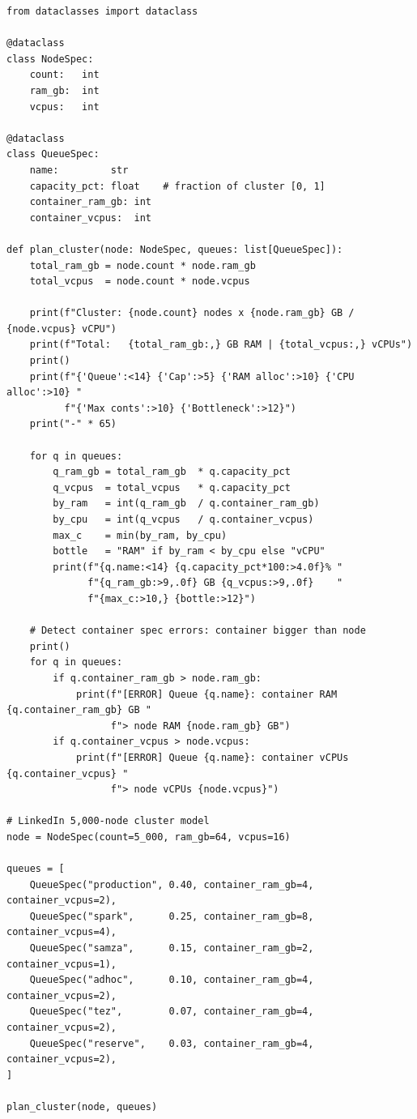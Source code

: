 \begin{lstlisting}[style=pyspark, caption={PE5.1: YARN capacity planning calculator}]
from dataclasses import dataclass

@dataclass
class NodeSpec:
    count:   int
    ram_gb:  int
    vcpus:   int

@dataclass
class QueueSpec:
    name:         str
    capacity_pct: float    # fraction of cluster [0, 1]
    container_ram_gb: int
    container_vcpus:  int

def plan_cluster(node: NodeSpec, queues: list[QueueSpec]):
    total_ram_gb = node.count * node.ram_gb
    total_vcpus  = node.count * node.vcpus

    print(f"Cluster: {node.count} nodes x {node.ram_gb} GB / {node.vcpus} vCPU")
    print(f"Total:   {total_ram_gb:,} GB RAM | {total_vcpus:,} vCPUs")
    print()
    print(f"{'Queue':<14} {'Cap':>5} {'RAM alloc':>10} {'CPU alloc':>10} "
          f"{'Max conts':>10} {'Bottleneck':>12}")
    print("-" * 65)

    for q in queues:
        q_ram_gb = total_ram_gb  * q.capacity_pct
        q_vcpus  = total_vcpus   * q.capacity_pct
        by_ram   = int(q_ram_gb  / q.container_ram_gb)
        by_cpu   = int(q_vcpus   / q.container_vcpus)
        max_c    = min(by_ram, by_cpu)
        bottle   = "RAM" if by_ram < by_cpu else "vCPU"
        print(f"{q.name:<14} {q.capacity_pct*100:>4.0f}% "
              f"{q_ram_gb:>9,.0f} GB {q_vcpus:>9,.0f}    "
              f"{max_c:>10,} {bottle:>12}")

    # Detect container spec errors: container bigger than node
    print()
    for q in queues:
        if q.container_ram_gb > node.ram_gb:
            print(f"[ERROR] Queue {q.name}: container RAM {q.container_ram_gb} GB "
                  f"> node RAM {node.ram_gb} GB")
        if q.container_vcpus > node.vcpus:
            print(f"[ERROR] Queue {q.name}: container vCPUs {q.container_vcpus} "
                  f"> node vCPUs {node.vcpus}")

# LinkedIn 5,000-node cluster model
node = NodeSpec(count=5_000, ram_gb=64, vcpus=16)

queues = [
    QueueSpec("production", 0.40, container_ram_gb=4,  container_vcpus=2),
    QueueSpec("spark",      0.25, container_ram_gb=8,  container_vcpus=4),
    QueueSpec("samza",      0.15, container_ram_gb=2,  container_vcpus=1),
    QueueSpec("adhoc",      0.10, container_ram_gb=4,  container_vcpus=2),
    QueueSpec("tez",        0.07, container_ram_gb=4,  container_vcpus=2),
    QueueSpec("reserve",    0.03, container_ram_gb=4,  container_vcpus=2),
]

plan_cluster(node, queues)
\end{lstlisting}

